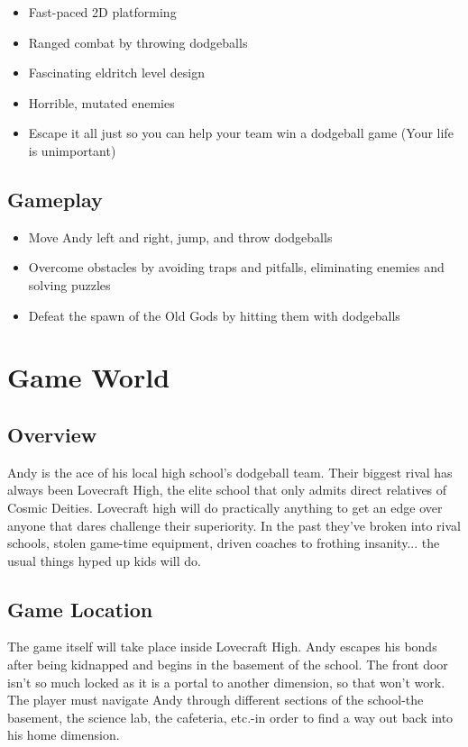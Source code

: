 \documentclass [12pt]{article}
\begin{document}
\begin{itemize}
\item Fast-paced 2D platforming
\item Ranged combat by throwing dodgeballs
\item Fascinating eldritch level design
\item Horrible, mutated enemies
\item Escape it all just so you can help your team win a dodgeball game (Your life is unimportant)
\end{itemize}

\subsection*{Gameplay}

\begin{itemize}
\item Move Andy left and right, jump, and throw dodgeballs
\item Overcome obstacles by avoiding traps and pitfalls, eliminating enemies and solving puzzles
\item Defeat the spawn of the Old Gods by hitting them with dodgeballs
\end{itemize}

\section*{Game World}

\subsection*{Overview}

Andy is the ace of his local high school's dodgeball team. Their biggest rival has always been Lovecraft High, the elite school that only admits direct relatives of Cosmic Deities. Lovecraft high will do practically anything to get an edge over anyone that dares challenge their superiority. In the past they've broken into rival schools, stolen game-time equipment, driven coaches to frothing insanity... the usual things hyped up kids will do.

\subsection*{Game Location}

The game itself will take place inside Lovecraft High. Andy escapes his bonds after being kidnapped and begins in the basement of the school. The front door isn't so much locked as it is a portal to another dimension, so that won't work. The player must navigate Andy through different sections of the school-the basement, the science lab, the cafeteria, etc.-in order to find a way out back into his home dimension.
\end{document}
